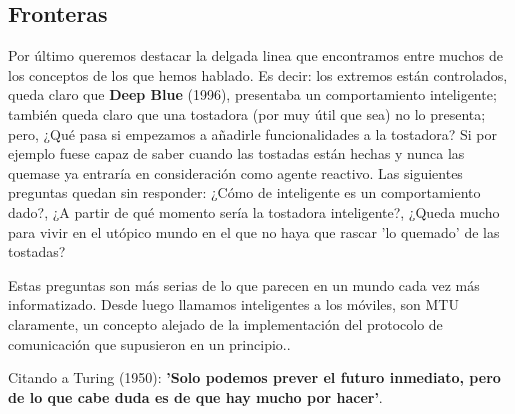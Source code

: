 \subsection{Fronteras}

Por último queremos destacar la delgada linea que encontramos entre muchos de los conceptos de los que hemos hablado. Es decir: los extremos están controlados, queda claro que \textbf{Deep Blue} (1996), presentaba un comportamiento inteligente; también queda claro que una tostadora (por muy útil que sea) no lo presenta; pero, ¿Qué pasa si empezamos a añadirle funcionalidades a la tostadora? Si por ejemplo fuese capaz de saber cuando las tostadas están hechas y nunca las quemase ya entraría en consideración como agente reactivo. Las siguientes preguntas quedan sin responder: ¿Cómo de inteligente es un comportamiento dado?, ¿A partir de qué momento sería la tostadora inteligente?, ¿Queda mucho para vivir en el utópico mundo en el que no haya que rascar 'lo quemado' de las tostadas?

\vspace{10px}

Estas preguntas son más serias de lo que parecen en un mundo cada vez más informatizado. Desde luego llamamos inteligentes a los móviles, son MTU claramente, un concepto alejado de la implementación del protocolo de comunicación que supusieron en un principio.. 

\vspace{10px}

Citando a Turing (1950): \textbf{'Solo podemos prever el futuro inmediato, pero de lo que cabe duda es de que hay mucho por hacer'}.



\newpage
	
